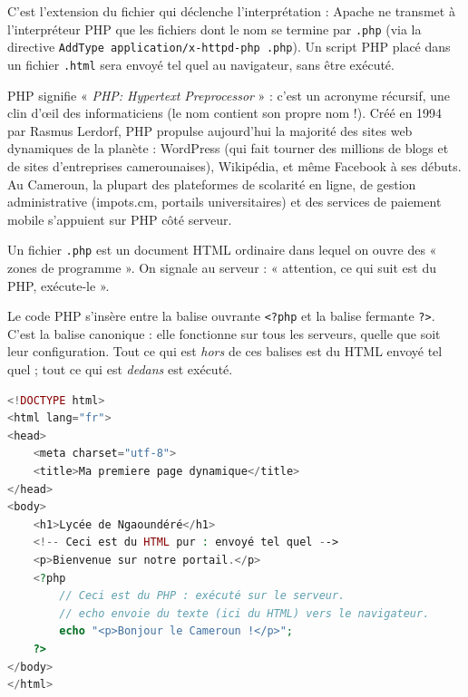 \documentclass[11pt]{article}
\newcommand{\cle}[1]{{\popxbold\color{popdark}#1}}
\newcounter{popsec}
\newcounter{popsub}
\newcommand{\courssub}[1]{%
  \stepcounter{popsub}%
  \par\vspace{9pt}\noindent{\popxbold\fontsize{11.5}{13}\selectfont\color{popink}{\color{poporange}\thepopsec.\thepopsub}\hspace{6pt}#1}\par\nopagebreak\vspace{4pt}
}
\begin{document}
\begin{propriete}
C'est l'extension du fichier qui déclenche l'interprétation : Apache ne transmet à l'interpréteur PHP que les fichiers dont le nom se termine par \texttt{.php} (via la directive \texttt{AddType application/x-httpd-php .php}). Un script PHP placé dans un fichier \texttt{.html} sera envoyé tel quel au navigateur, sans être exécuté.
\end{propriete}

\begin{savaistu}
PHP signifie « \emph{PHP: Hypertext Preprocessor} » : c'est un \cle{acronyme récursif}, une clin d'œil des informaticiens (le nom contient son propre nom !). Créé en 1994 par Rasmus Lerdorf, PHP propulse aujourd'hui la majorité des sites web dynamiques de la planète : WordPress (qui fait tourner des millions de blogs et de sites d'entreprises camerounaises), Wikipédia, et même Facebook à ses débuts. Au Cameroun, la plupart des plateformes de scolarité en ligne, de gestion administrative (impots.cm, portails universitaires) et des services de paiement mobile s'appuient sur PHP côté serveur.
\end{savaistu}

\courssub{Insérer du PHP dans un document HTML}

Un fichier \texttt{.php} est un document HTML ordinaire dans lequel on ouvre des « zones de programme ». On signale au serveur : « attention, ce qui suit est du PHP, exécute-le ».

\begin{propriete}
Le code PHP s'insère entre la balise ouvrante \texttt{<?php} et la balise fermante \texttt{?>}. C'est la \cle{balise canonique} : elle fonctionne sur tous les serveurs, quelle que soit leur configuration. Tout ce qui est \emph{hors} de ces balises est du HTML envoyé tel quel ; tout ce qui est \emph{dedans} est exécuté.
\end{propriete}

\begin{exemplebox}
\begin{lstlisting}[language=Php]
<!DOCTYPE html>
<html lang="fr">
<head>
    <meta charset="utf-8">
    <title>Ma premiere page dynamique</title>
</head>
<body>
    <h1>Lycée de Ngaoundéré</h1>
    <!-- Ceci est du HTML pur : envoyé tel quel -->
    <p>Bienvenue sur notre portail.</p>
    <?php
        // Ceci est du PHP : exécuté sur le serveur.
        // echo envoie du texte (ici du HTML) vers le navigateur.
        echo "<p>Bonjour le Cameroun !</p>";
    ?>
</body>
</html>
\end{lstlisting}
\end{exemplebox}
\end{document}
